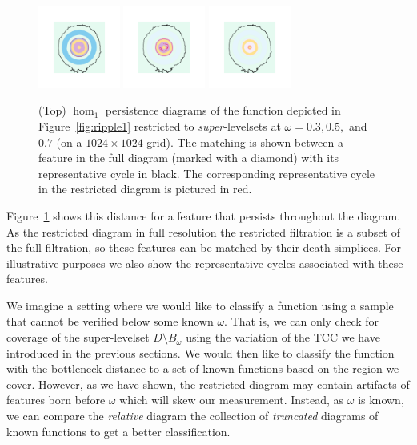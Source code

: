 \begin{figure}[htbp]
  \includegraphics[trim=500 500 500 500, clip, width=0.24\textwidth]{scripts/figures/matching2/surf_top-1_0.png}
  \includegraphics[trim=500 500 500 500, clip, width=0.24\textwidth]{scripts/figures/matching2/surf_top-1_1.png}
  \includegraphics[trim=500 500 500 500, clip, width=0.24\textwidth]{scripts/figures/matching2/surf_top-1_2.png}
  \caption{(Top) $\hom_1$ persistence diagrams of the function depicted in Figure~\ref{fig:ripple1} restricted to \emph{super}-levelsets at $\omega = 0.3, 0.5,$ and $0.7$ (on a $1024\times 1024$ grid).
  The matching is shown between a feature in the full diagram (marked with a diamond) with its representative cycle in black.
  The corresponding representative cycle in the restricted diagram is pictured in red.}\label{fig:restricted}
\end{figure}

Figure~\ref{fig:restricted} shows this distance for a feature that persists throughout the diagram.
As the restricted diagram in full resolution the restricted filtration is a subset of the full filtration, so these features can be matched by their death simplices.
For illustrative purposes we also show the representative cycles associated with these features.

We imagine a setting where we would like to classify a function using a sample that cannot be verified below some known $\omega$.
That is, we can only check for coverage of the super-levelset $D\setminus B_\omega$ using the variation of the TCC we have introduced in the previous sections.
We would then like to classify the function with the bottleneck distance to a set of known functions based on the region we cover.
However, as we have shown, the restricted diagram may contain artifacts of features born before $\omega$ which will skew our measurement.
Instead, as $\omega$ is known, we can compare the \emph{relative} diagram the collection of \emph{truncated} diagrams of known functions to get a better classification.

